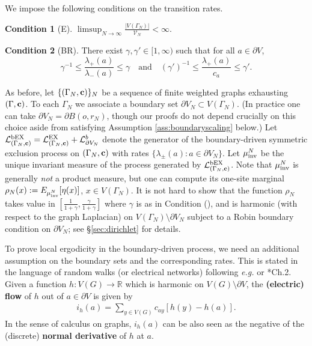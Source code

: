 \documentclass[11pt]{amsart}
\theoremstyle{plain}
\theoremstyle{definition}
\newtheorem*{condition}{Condition}
\theoremstyle{remark}
\begin{document}
We impose the following conditions on the transition rates.

\begin{condition}[E] \label{ass:boundedaway}
$\displaystyle \limsup_{N\to\infty} \frac{|V(\Gamma_N)|}{\mathcal{V}_N} < \infty$.
\end{condition}

\begin{condition}[BR] \label{ass:boundaryrate}
There exist $\gamma,\gamma'\in [1,\infty)$ such that for all $a\in \partial V$, 
$$
\gamma^{-1} \leq \frac{\lambda_+(a)}{\lambda_-(a)} \leq \gamma \quad\text{and}\quad (\gamma')^{-1} \leq \frac{\lambda_+(a)}{c_a} \leq \gamma'.
$$
\end{condition}


As before, let $\{(\Gamma_N,{\bf c})\}_N$ be a sequence of finite weighted graphs exhausting $(\Gamma,{\bf c})$. To each $\Gamma_N$ we associate a boundary set $\partial V_N \subset V(\Gamma_N)$. (In practice one can take $\partial V_N = \partial B(o, r_N)$, though our proofs do not depend crucially on this choice aside from satisfying Assumption \ref{ass:boundaryscaling} below.) Let $\mathcal{L}^{\rm bEX}_{(\Gamma_N, {\bf c})} = \mathcal{L}^{\rm EX}_{(\Gamma_N, {\bf c})} + \mathcal{L}^b_{\partial V_N}$ denote the generator of the boundary-driven symmetric exclusion process on $(\Gamma_N, {\bf c})$ with rates $\{\lambda_\pm(a): a\in \partial V_N\}$. Let $\mu^N_{\rm inv}$ be the unique invariant measure of the process generated by $\mathcal{L}^{\rm bEX}_{(\Gamma_N, {\bf c})}$. Note that $\mu^N_{\rm inv}$ is generally \emph{not} a product measure, but one can compute its one-site marginal $\rho_N(x):= E_{\mu_{\rm inv}^N}[\eta(x)]$, $x\in V(\Gamma_N)$. It is not hard to show that the function $\rho_N$ takes value in $\left[\frac{1}{1+\gamma}, \frac{\gamma}{1+\gamma}\right]$ where $\gamma$ is as in Condition (), and is harmonic (with respect to the graph Laplacian) on $V(\Gamma_N) \setminus \partial V_N$ subject to a Robin boundary condition on $\partial V_N$; see \S\ref{sec:dirichlet} for details.

To prove local ergodicity in the boundary-driven process, we need an additional assumption on the boundary sets and the corresponding rates. This is stated in the language of random walks (or electrical networks) following \emph{e.g.\@} \cite{DoyleSnell} or \cite{LyonsPeres}*{Ch.\@ 2}. Given a function $h: V(G)\to\mathbb{R}$ which is harmonic on $V(G)\setminus \partial V$, the \textbf{(electric) flow} of $h$ out of $a\in \partial V$ is given by
\begin{align}
\label{eq:flow}
i_h(a) = \sum_{y\in V(G)} c_{ay}[h(y)-h(a)].
\end{align}
In the sense of calculus on graphs, $i_h(a)$ can be also seen as the negative of the (discrete) \textbf{normal derivative} of $h$ at $a$.
\end{document}
